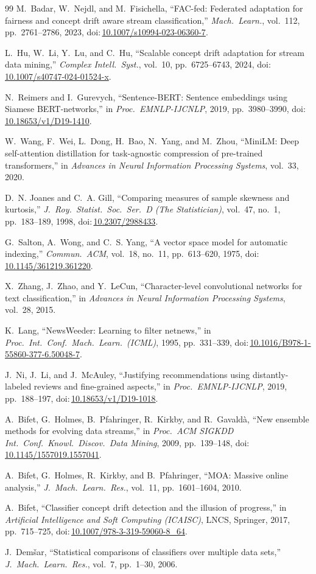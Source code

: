 \documentclass[conference]{IEEEtran}
\newcommand{\doi}[1]{doi:\,\url{#1}}
\begin{document}
\begin{thebibliography}{99}
 M.~Badar, W.~Nejdl, and M.~Fisichella, ``FAC-fed: Federated adaptation for fairness and concept drift aware stream classification,'' \emph{Mach.\ Learn.}, vol.~112, pp.~2761--2786, 2023, \doi{10.1007/s10994-023-06360-7}.

 L.~Hu, W.~Li, Y.~Lu, and C.~Hu, ``Scalable concept drift adaptation for stream data mining,'' \emph{Complex Intell.\ Syst.}, vol.~10, pp.~6725--6743, 2024, \doi{10.1007/s40747-024-01524-x}.

 N.~Reimers and I.~Gurevych, ``Sentence-BERT: Sentence embeddings using Siamese BERT-networks,'' in \emph{Proc.\ EMNLP-IJCNLP}, 2019, pp.~3980--3990, \doi{10.18653/v1/D19-1410}.

 W.~Wang, F.~Wei, L.~Dong, H.~Bao, N.~Yang, and M.~Zhou, ``MiniLM: Deep self-attention distillation for task-agnostic compression of pre-trained transformers,'' in \emph{Advances in Neural Information Processing Systems}, vol.~33, 2020.

 D.~N. Joanes and C.~A. Gill, ``Comparing measures of sample skewness and kurtosis,'' \emph{J.\ Roy.\ Statist.\ Soc.\ Ser.\ D (The Statistician)}, vol.~47, no.~1, pp.~183--189, 1998, \doi{10.2307/2988433}.

 G.~Salton, A.~Wong, and C.~S. Yang, ``A vector space model for automatic indexing,'' \emph{Commun.\ ACM}, vol.~18, no.~11, pp.~613--620, 1975, \doi{10.1145/361219.361220}.

 X.~Zhang, J.~Zhao, and Y.~LeCun, ``Character-level convolutional networks for text classification,'' in \emph{Advances in Neural Information Processing Systems}, vol.~28, 2015.

 K.~Lang, ``NewsWeeder: Learning to filter netnews,'' in \emph{Proc.\ Int.\ Conf.\ Mach.\ Learn.\ (ICML)}, 1995, pp.~331--339, \doi{10.1016/B978-1-55860-377-6.50048-7}.

 J.~Ni, J.~Li, and J.~McAuley, ``Justifying recommendations using distantly-labeled reviews and fine-grained aspects,'' in \emph{Proc.\ EMNLP-IJCNLP}, 2019, pp.~188--197, \doi{10.18653/v1/D19-1018}.

 A.~Bifet, G.~Holmes, B.~Pfahringer, R.~Kirkby, and R.~Gavald\`a, ``New ensemble methods for evolving data streams,'' in \emph{Proc.\ ACM SIGKDD Int.\ Conf.\ Knowl.\ Discov.\ Data Mining}, 2009, pp.~139--148, \doi{10.1145/1557019.1557041}.

 A.~Bifet, G.~Holmes, R.~Kirkby, and B.~Pfahringer, ``MOA: Massive online analysis,'' \emph{J.\ Mach.\ Learn.\ Res.}, vol.~11, pp.~1601--1604, 2010.

 A.~Bifet, ``Classifier concept drift detection and the illusion of progress,'' in \emph{Artificial Intelligence and Soft Computing (ICAISC)}, LNCS, Springer, 2017, pp.~715--725, \doi{10.1007/978-3-319-59060-8_64}.

 J.~Dem\v{s}ar, ``Statistical comparisons of classifiers over multiple data sets,'' \emph{J.\ Mach.\ Learn.\ Res.}, vol.~7, pp.~1--30, 2006.
\end{thebibliography}
\end{document}
